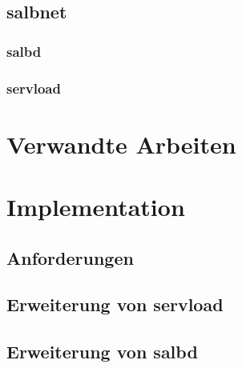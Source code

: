 \documentclass[a4paper, 11pt, toc=bibliography, toc=listof]{scrbook}
\begin{document}

		\section{salbnet} %
		\label{sec:salbnet}
			
			\subsection{salbd} %
			\label{sub:salbd}
				

			\subsection{servload} %
			\label{sub:servload}
				



	\chapter{Verwandte Arbeiten} %
	\label{cha:Verwandte Arbeiten}
		

	\chapter{Implementation} %
	\label{cha:Implementation}
		
		\section{Anforderungen} %
		\label{sec:Anforderungen}
			

		\section{Erweiterung von servload} %
		\label{sec:Erweiterung von servload}
			

		\section{Erweiterung von salbd} %
		\label{sec:Erweiterung von salbd}
			
\end{document}
